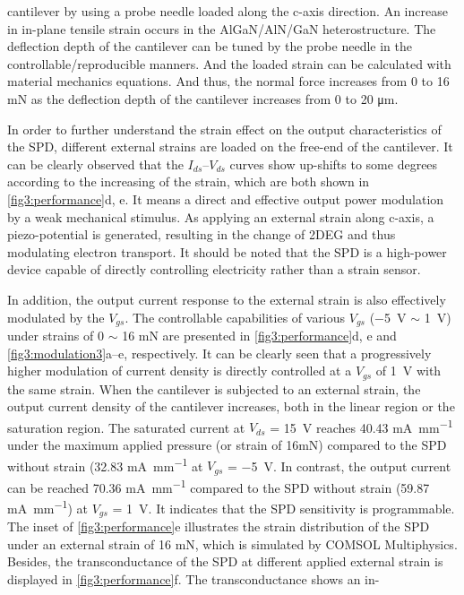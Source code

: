 \noindent cantilever by using a probe needle loaded along the c-axis direction. An increase in in-plane tensile strain occurs in the AlGaN/AlN/GaN heterostructure. The deflection depth of the cantilever can be tuned by the probe needle in the controllable/reproducible manners. And the loaded strain can be calculated with material mechanics equations. And thus, the normal force increases from 0 to 16 \unit{\mN} as the deflection depth of the cantilever increases from 0 to 20 \unit{\um}.

In order  to further understand the strain effect on the output characteristics of the  SPD, different external strains are loaded on the free-end of the cantilever. It can be clearly observed that the $I_{ds}$–$V_{ds}$ curves show up-shifts to some degrees according to the increasing of the strain, which are both shown in \autoref{fig3:performance}d, e. It means a direct and effective output power  modulation by a weak mechanical stimulus. As applying an external strain along c-axis, a piezo-potential is generated, resulting in the change of 2DEG  and thus modulating electron transport. It should be noted that the SPD is a high-power device capable of directly controlling electricity rather than a strain sensor.

In addition, the output current  response to the external strain is also effectively modulated by the $V_{gs}$. The controllable capabilities of various $V_{gs}$ (\SI{-5}{\volt} $\sim$ \SI{1}{\volt}) under strains of 0 $\sim$ 16 \unit{\mN} are presented in \autoref{fig3:performance}d, e and \autoref{fig3:modulation3}a–e, respectively. It can be clearly seen that a progressively higher modulation of current density is directly controlled at a $V_{gs}$ of \SI{1}{\volt} with the same strain. When the cantilever  is subjected to an external strain, the output current density of the cantilever increases, both in the linear region or the saturation region. The saturated current at $V_{ds}$ = \SI{15}{\volt} reaches 40.43 \unit{\mA\per\mm} under the maximum applied pressure (or strain of 16\unit{\mN}) compared to the SPD without strain (32.83 \unit{\mA\per\mm} at $V_{gs}$ = \SI{-5}{\volt}. In contrast, the output current can be reached 70.36 \unit{\mA\per\mm} compared to the SPD without strain (59.87 \unit{\mA\per\mm}) at $V_{gs}$ = \SI{1}{\volt}. It indicates that the SPD sensitivity is programmable. The inset of \autoref{fig3:performance}e illustrates the strain distribution of the SPD under an external strain of 16 \unit{\mN}, which is simulated by COMSOL Multiphysics. Besides, the transconductance of the SPD  at different applied external strain is displayed in \autoref{fig3:performance}f. The transconductance shows an in-



